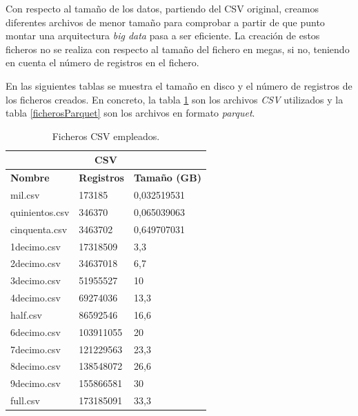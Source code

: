 Con respecto al tamaño de los datos, partiendo del \gls{CSV} original, creamos diferentes archivos de menor tamaño para comprobar a partir de que punto montar una arquitectura \textit{big data} pasa a ser eficiente. La creación de estos ficheros no se realiza con respecto al tamaño del fichero en megas, si no, teniendo en cuenta el número de registros en el fichero. 

En las siguientes tablas se muestra el tamaño en disco y el número de registros de los ficheros creados. En concreto, la tabla \ref{ficherosCSV} son los archivos \textit{\gls{CSV}} utilizados y la tabla \ref{ficherosParquet} son los archivos en formato \textit{parquet}.

\begin{table}[htp!]
	\centering
	\caption{Ficheros \gls{CSV} empleados.}
	\label{ficherosCSV}
	\begin{tabular}{|l|l|l|}
		\hline
		\multicolumn{3}{|c|}{\textbf{CSV}}                          \\ \hline
		\textbf{Nombre} & \textbf{Registros} & \textbf{Tamaño (GB)} \\ \hline
		mil.csv         & 173185             & 0,032519531          \\ \hline
		quinientos.csv  & 346370             & 0,065039063          \\ \hline
		cinquenta.csv   & 3463702            & 0,649707031          \\ \hline
		1decimo.csv     & 17318509           & 3,3                  \\ \hline
		2decimo.csv     & 34637018           & 6,7                  \\ \hline
		3decimo.csv     & 51955527           & 10                   \\ \hline
		4decimo.csv     & 69274036           & 13,3                 \\ \hline
		half.csv        & 86592546           & 16,6                 \\ \hline
		6decimo.csv     & 103911055          & 20                   \\ \hline
		7decimo.csv     & 121229563          & 23,3                 \\ \hline
		8decimo.csv     & 138548072          & 26,6                 \\ \hline
		9decimo.csv     & 155866581          & 30                   \\ \hline
		full.csv        & 173185091          & 33,3                 \\ \hline
	\end{tabular}
\end{table}

